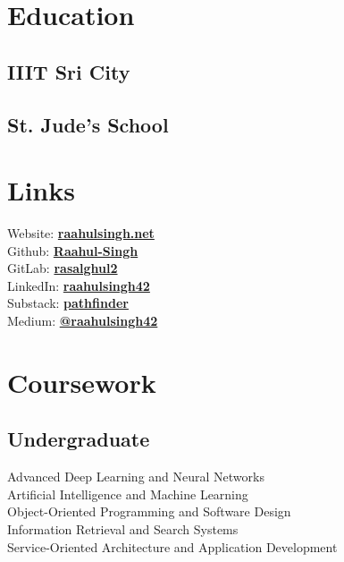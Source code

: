 \documentclass[]{raahul_singh_resume}
\begin{document}

\begin{minipage}[t]{0.33\textwidth} 

\section{Education} 

\subsection{IIIT Sri City}
\sectionsep

\subsection{St. Jude's School}
\sectionsep

\section{Links} 
Website: \href{https://raahulsingh.net}{\bf raahulsingh.net} \\
Github: \href{https://github.com/Raahul-Singh}{\bf Raahul-Singh} \\
GitLab:  \href{https://gitlab.com/rasalghul2}{\bf rasalghul2} \\
LinkedIn:  \href{https://linkedin.com/in/raahulsingh42}{\bf raahulsingh42} \\
Substack:  \href{https://raahulsingh.substack.com}{\bf pathfinder} \\
Medium:  \href{https://medium.com/@_hawks_}{\bf @raahulsingh42} \\

\section{Coursework}
\subsection{Undergraduate}
\textbullet{}Advanced Deep Learning and Neural Networks \\
\textbullet{}Artificial Intelligence and Machine Learning \\
\textbullet{}Object-Oriented Programming and Software Design \\
\textbullet{}Information Retrieval and Search Systems \\
\textbullet{}Service-Oriented Architecture and Application Development \\
\sectionsep


\end{minipage}
\end{document}
